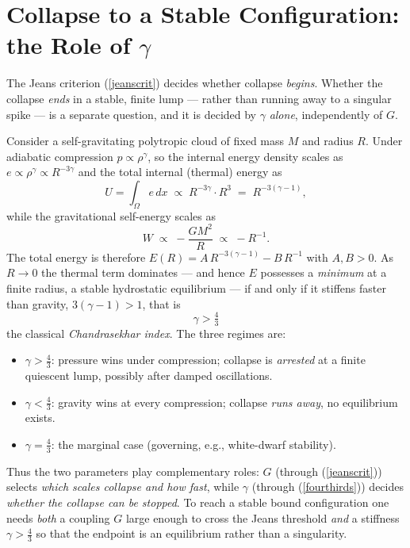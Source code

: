 \section{Collapse to a Stable Configuration: the Role of $\gamma$}

The Jeans criterion (\ref{jeanscrit}) decides whether collapse \emph{begins}.
Whether the collapse \emph{ends} in a stable, finite lump --- rather than
running away to a singular spike --- is a separate question, and it is decided
by $\gamma$ \emph{alone}, independently of $G$.

Consider a self-gravitating polytropic cloud of fixed mass $M$ and radius $R$.
Under adiabatic compression $p\propto\rho^\gamma$, so the internal energy
density scales as $e\propto\rho^\gamma\propto R^{-3\gamma}$ and the total
internal (thermal) energy as
\[
U=\int_\Omega e\,dx \;\propto\; R^{-3\gamma}\cdot R^3 \;=\; R^{-3(\gamma -1)},
\]
while the gravitational self-energy scales as
\[
W \;\propto\; -\frac{GM^2}{R}\;\propto\; -R^{-1}.
\]
The total energy is therefore $E(R)=A\,R^{-3(\gamma -1)}-B\,R^{-1}$ with
$A,B>0$. As $R\to 0$ the thermal term dominates --- and hence $E$ possesses a
\emph{minimum} at a finite radius, a stable hydrostatic equilibrium --- if and
only if it stiffens faster than gravity, $3(\gamma -1)>1$, that is
\begin{equation}\label{fourthirds}
\boxed{\;\gamma>\tfrac43\;}
\end{equation}
the classical \emph{Chandrasekhar index}. The three regimes are:
\begin{itemize}
\item $\gamma>\tfrac43$: pressure wins under compression; collapse is
\emph{arrested} at a finite quiescent lump, possibly after damped oscillations.
\item $\gamma<\tfrac43$: gravity wins at every compression; collapse
\emph{runs away}, no equilibrium exists.
\item $\gamma=\tfrac43$: the marginal case (governing, e.g., white-dwarf
stability).
\end{itemize}
Thus the two parameters play complementary roles: $G$ (through (\ref{jeanscrit}))
selects \emph{which scales collapse and how fast}, while $\gamma$ (through
(\ref{fourthirds})) decides \emph{whether the collapse can be stopped}. To reach
a stable bound configuration one needs \emph{both} a coupling $G$ large enough
to cross the Jeans threshold \emph{and} a stiffness $\gamma>\tfrac43$ so that the
endpoint is an equilibrium rather than a singularity.

